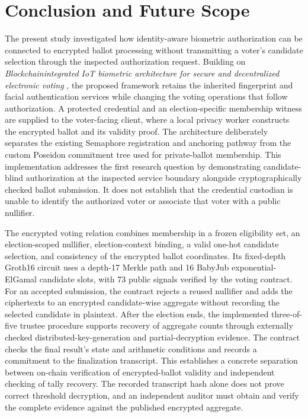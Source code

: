 
\section{Conclusion and Future Scope}
\label{sec:10}
\label{sec:conclusion}

The present study investigated how identity-aware biometric authorization can
be connected to encrypted ballot processing without transmitting a voter's
candidate selection through the inspected authorization request. Building
on \emph{Blockchain\textendash{}integrated IoT biometric architecture for
secure and decentralized electronic voting}
\citep{rifat2026biometric}, the proposed framework retains the inherited
fingerprint and facial authentication services while changing the voting
operations that follow authorization. A protected credential and an
election-specific membership witness are supplied to the voter-facing client,
where a local privacy worker constructs the encrypted ballot and its validity
proof. The architecture deliberately separates the existing Semaphore
registration and anchoring pathway from the custom Poseidon commitment tree
used for private-ballot membership. This implementation addresses the first
research question by demonstrating candidate-blind authorization at the
inspected service boundary alongside cryptographically checked ballot
submission. It does not establish that the credential custodian is unable to
identify the authorized voter or associate that voter with a public nullifier.

The encrypted voting relation combines membership in a frozen eligibility
set, an election-scoped nullifier, election-context binding, a valid one-hot
candidate selection, and consistency of the encrypted ballot coordinates.
Its fixed-depth Groth16 circuit uses a depth-17 Merkle path and 16 BabyJub
exponential-ElGamal candidate slots, with 73 public signals verified by the
voting contract. For an accepted submission, the contract rejects a reused
nullifier and adds the ciphertexts to an encrypted candidate-wise aggregate
without recording the selected candidate in plaintext. After the election
ends, the implemented three-of-five trustee procedure supports recovery of
aggregate counts through externally checked distributed-key-generation and
partial-decryption evidence. The contract checks the final result's state
and arithmetic conditions and records a commitment to the finalization
transcript. This establishes a concrete separation between on-chain
verification of encrypted-ballot validity and independent checking of tally
recovery. The recorded transcript hash alone does not prove correct
threshold decryption, and an independent auditor must obtain and verify the
complete evidence against the published encrypted aggregate.

